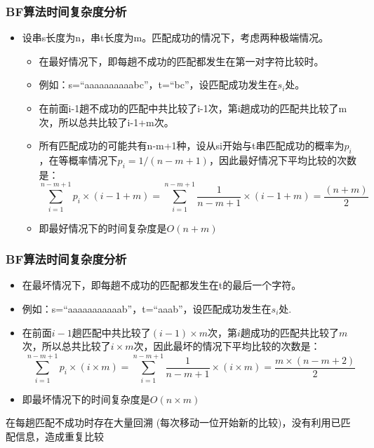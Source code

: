 \begin{frame}[fragile]
  \frametitle{BF算法时间复杂度分析}
  \begin{itemize}
  \item 设串s长度为n，串t长度为m。匹配成功的情况下，考虑两种极端情况。
    \begin{itemize}
    \item 在最好情况下，即每趟不成功的匹配都发生在第一对字符比较时。
    \item 例如：s=“aaaaaaaaaabc”，t=“bc”，设匹配成功发生在$s_i$处。
    \item 在前面i-1趟不成功的匹配中共比较了i-1次，第i趟成功的匹配共比较了m次，所以总共比较了i-1+m次。
    \item 所有匹配成功的可能共有n-m+1种，设从si开始与t串匹配成功的概率为$p_i$，在等概率情况下$p_i=1/(n-m+1)$，因此最好情况下平均比较的次数是：
      \[\sum_{i=1}^{n-m+1} p_i \times (i-1+m) = \sum_{i=1}^{n-m+1} \dfrac{1}{n-m+1} \times (i-1+m) = \dfrac{(n+m)}{2}\]

    \item 即最好情况下的时间复杂度是$O(n+m)$
    \end{itemize}
  \end{itemize}
\end{frame}

\begin{frame}[fragile]
  \frametitle{BF算法时间复杂度分析}
  \begin{itemize}
  \item 在最坏情况下，即每趟不成功的匹配都发生在t的最后一个字符。
  \item 例如：s=“aaaaaaaaaaab”，t=“aaab”，设匹配成功发生在$s_i$处.
  \item 在前面$i-1$趟匹配中共比较了$(i-1) \times m$次，第$i$趟成功的匹配共比较了$m$次，所以总共比较了$i \times m$次，因此最坏的情况下平均比较的次数是：
    \[\sum_{i=1}^{n-m+1} p_i \times (i \times m) = \sum_{i=1}^{n-m+1} \dfrac{1}{n-m+1} \times (i \times m) = \dfrac{m \times (n-m+2)}{2}\]
  \item 即最坏情况下的时间复杂度是$O(n×m)$
  \end{itemize}

  \begin{tcolorbox}[title=为什么BF算法时间性能低？]
    在每趟匹配不成功时存在大量回溯 (每次移动一位开始新的比较)，没有利用已匹配信息，造成重复比较
  \end{tcolorbox}
\end{frame}

